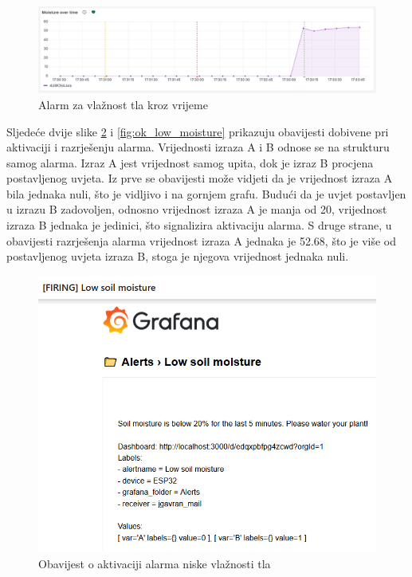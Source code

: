 \begin{figure}[ht]
	\centering
	\includegraphics[scale=0.35]{imgs/moisture_alert}
	\caption{Alarm za vlažnost tla kroz vrijeme}
	\label{fig:moisture_alert}
\end{figure}

Sljedeće dvije slike \ref{fig:firing_low_moisture} i \ref{fig:ok_low_moisture} prikazuju obavijesti dobivene pri aktivaciji i razrješenju alarma. Vrijednosti izraza A i B odnose se na strukturu samog alarma. Izraz A jest vrijednost samog upita, dok je izraz B procjena postavljenog uvjeta. Iz prve se obavijesti može vidjeti da je vrijednost izraza A bila jednaka nuli, što je vidljivo i na gornjem grafu. Budući da je uvjet postavljen u izrazu B zadovoljen, odnosno vrijednost izraza A je manja od 20, vrijednost izraza B jednaka je jedinici, što signalizira aktivaciju alarma. S druge strane, u obavijesti razrješenja alarma vrijednost izraza A jednaka je 52.68, što je više od postavljenog uvjeta izraza B, stoga je njegova vrijednost jednaka nuli. 

\begin{figure}[ht]
	\centering
	\includegraphics[scale=0.55]{imgs/firing_low_moisture}
	\caption{Obavijest o aktivaciji alarma niske vlažnosti tla}
	\label{fig:firing_low_moisture}
\end{figure}

